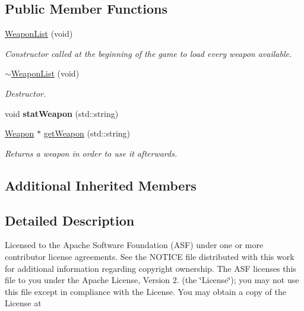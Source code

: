\subsection*{Public Member Functions}
\begin{DoxyCompactItemize}
\item 
\hyperlink{class_weapon_list_ac3a994cd2844ac00fcf09011f4209f48}{Weapon\-List} (void)
\begin{DoxyCompactList}\small\item\em Constructor called at the beginning of the game to load every weapon available. \end{DoxyCompactList}\item 
\hyperlink{class_weapon_list_a44f72440d8a4586b19e4b60d308b2e51}{$\sim$\-Weapon\-List} (void)
\begin{DoxyCompactList}\small\item\em Destructor. \end{DoxyCompactList}\item 
\hypertarget{class_weapon_list_ad39bd93b72f73eb7e69388dd5d4bfac2}{void {\bfseries stat\-Weapon} (std\-::string)}\label{class_weapon_list_ad39bd93b72f73eb7e69388dd5d4bfac2}

\item 
\hyperlink{class_weapon}{Weapon} $\ast$ \hyperlink{class_weapon_list_a97b9173cefa20573ed27d52d58d1292e}{get\-Weapon} (std\-::string)
\begin{DoxyCompactList}\small\item\em Returns a weapon in order to use it afterwards. \end{DoxyCompactList}\end{DoxyCompactItemize}
\subsection*{Additional Inherited Members}


\subsection{Detailed Description}
Licensed to the Apache Software Foundation (A\-S\-F) under one or more contributor license agreements. See the N\-O\-T\-I\-C\-E file distributed with this work for additional information regarding copyright ownership. The A\-S\-F licenses this file to you under the Apache License, Version 2. (the \char`\"{}\-License\char`\"{}); you may not use this file except in compliance with the License. You may obtain a copy of the License at

